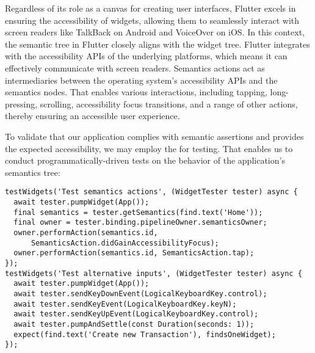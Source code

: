 \noindent Regardless of its role as a canvas for creating user interfaces, Flutter excels in ensuring the accessibility 
of widgets, allowing them to seamlessly interact with screen readers like TalkBack on Android and VoiceOver on iOS. In 
this context, the semantic tree in Flutter closely aligns with the widget tree. Flutter integrates with the 
accessibility APIs of the underlying platforms, which means it can effectively communicate with screen readers. 
Semantics actions act as intermediaries between the operating system's accessibility APIs and the semantics nodes. 
That enables various interactions, including tapping, long-pressing, scrolling, accessibility focus transitions, and a 
range of other actions, thereby ensuring an accessible user experience.

To validate that our application complies with semantic assertions and provides the expected accessibility, we may 
employ the  for testing. That enables us to conduct programmatically-driven tests on 
the behavior of the application's semantics tree:

\begin{lstlisting}
testWidgets('Test semantics actions', (WidgetTester tester) async {
  await tester.pumpWidget(App());
  final semantics = tester.getSemantics(find.text('Home'));
  final owner = tester.binding.pipelineOwner.semanticsOwner;
  owner.performAction(semantics.id,
      SemanticsAction.didGainAccessibilityFocus);
  owner.performAction(semantics.id, SemanticsAction.tap);
});
testWidgets('Test alternative inputs', (WidgetTester tester) async {
  await tester.pumpWidget(App());
  await tester.sendKeyDownEvent(LogicalKeyboardKey.control);
  await tester.sendKeyEvent(LogicalKeyboardKey.keyN);
  await tester.sendKeyUpEvent(LogicalKeyboardKey.control);
  await tester.pumpAndSettle(const Duration(seconds: 1));
  expect(find.text('Create new Transaction'), findsOneWidget);
});
\end{lstlisting}

